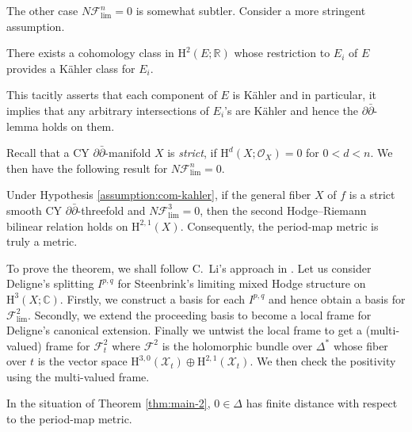 The other case \(N\mathcal{F}^{n}_{\mathrm{lim}}=0\) is somewhat subtler. 
Consider a more stringent assumption.
\begin{assumption}
\label{assumption:com-kahler}
There exists a cohomology class in 
\(\mathrm{H}^{2}(E;\mathbb{R})\) whose restriction to \(E_{i}\)
of \(E\) provides a K\"{a}hler class for \(E_{i}\).
\end{assumption}
This tacitly asserts that each component of \(E\) is K\"{a}hler and
in particular, it implies that any arbitrary intersections of \(E_{i}\)'s are K\"{a}hler and
hence the \(\partial\bar{\partial}\)-lemma holds on them.

Recall that a CY 
\(\partial\bar{\partial}\)-manifold \(X\) is \emph{strict},
if \(\mathrm{H}^{d}(X;\mathcal{O}_{X})=0\)
for \(0<d<n\). We then have the following result
for \(N\mathcal{F}^{n}_{\mathrm{lim}}=0\).
\begin{theorem}[= Proposition \ref{prop:finite-distance-polarized}]
\label{thm:main-2}
Under Hypothesis \ref{assumption:com-kahler},
if the general fiber \(X\) of \(f\) is a strict smooth CY 
\(\partial\bar{\partial}\)-threefold and \(N\mathcal{F}^{3}_{\mathrm{lim}}=0\), then
the second Hodge--Riemann bilinear relation holds
on \(\mathrm{H}^{2,1}(X)\). Consequently, the period-map metric
is truly a metric.
\end{theorem}

To prove the theorem, we shall follow C.~Li's
approach in \cite{2022-Li-polarized-hodge-structures-for-clemens-manifolds}.
Let us consider Deligne's splitting \(I^{p,q}\) for 
Steenbrink's limiting mixed Hodge structure 
on \(\mathrm{H}^{3}(X;\mathbb{C})\).
Firstly, we construct a basis for each \(I^{p,q}\) and hence
obtain a basis for \(\mathcal{F}_{\mathrm{lim}}^{2}\). 
Secondly, we extend the proceeding basis to become a local frame 
for Deligne's canonical extension. Finally we untwist the local frame 
to get a (multi-valued) frame for \(\mathcal{F}^{2}_{t}\)
where \(\mathcal{F}^{2}\) is the holomorphic bundle over \(\Delta^{\ast}\)
whose fiber over \(t\) is the vector space
\(\mathrm{H}^{3,0}(\mathcal{X}_{t})\oplus \mathrm{H}^{2,1}(\mathcal{X}_{t})\).
We then check the positivity using the multi-valued frame.

\begin{corollary}[= Theorem \ref{thm:finite-distance}]
In the situation of Theorem \ref{thm:main-2}, \(0\in\Delta\) has finite distance
with respect to the period-map metric.
\end{corollary}

